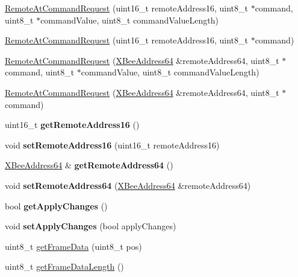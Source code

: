 \begin{DoxyCompactItemize}
\item 
\hyperlink{class_remote_at_command_request_ac6977fe584bab7d7414b0c45d1ae37cc}{Remote\+At\+Command\+Request} (uint16\+\_\+t remote\+Address16, uint8\+\_\+t $\ast$command, uint8\+\_\+t $\ast$command\+Value, uint8\+\_\+t command\+Value\+Length)
\item 
\hyperlink{class_remote_at_command_request_ae8139e39010dcd8956a4281109885a81}{Remote\+At\+Command\+Request} (uint16\+\_\+t remote\+Address16, uint8\+\_\+t $\ast$command)
\item 
\hyperlink{class_remote_at_command_request_ae49de42cdec0b9689882e2372a3bae1d}{Remote\+At\+Command\+Request} (\hyperlink{class_x_bee_address64}{X\+Bee\+Address64} \&remote\+Address64, uint8\+\_\+t $\ast$command, uint8\+\_\+t $\ast$command\+Value, uint8\+\_\+t command\+Value\+Length)
\item 
\hyperlink{class_remote_at_command_request_aa01b3f59d62d444ad78d6f1bbf8124aa}{Remote\+At\+Command\+Request} (\hyperlink{class_x_bee_address64}{X\+Bee\+Address64} \&remote\+Address64, uint8\+\_\+t $\ast$command)
\item 
\hypertarget{class_remote_at_command_request_a1802fa7c5d644184f19fcd3da839f08a}{}\label{class_remote_at_command_request_a1802fa7c5d644184f19fcd3da839f08a} 
uint16\+\_\+t {\bfseries get\+Remote\+Address16} ()
\item 
\hypertarget{class_remote_at_command_request_a91d4ee0fa25a634e419df1b0059f6073}{}\label{class_remote_at_command_request_a91d4ee0fa25a634e419df1b0059f6073} 
void {\bfseries set\+Remote\+Address16} (uint16\+\_\+t remote\+Address16)
\item 
\hypertarget{class_remote_at_command_request_ab6c602ded638f7740ac69319915e0389}{}\label{class_remote_at_command_request_ab6c602ded638f7740ac69319915e0389} 
\hyperlink{class_x_bee_address64}{X\+Bee\+Address64} \& {\bfseries get\+Remote\+Address64} ()
\item 
\hypertarget{class_remote_at_command_request_abf42b8f760f1f1959de090f4493e928b}{}\label{class_remote_at_command_request_abf42b8f760f1f1959de090f4493e928b} 
void {\bfseries set\+Remote\+Address64} (\hyperlink{class_x_bee_address64}{X\+Bee\+Address64} \&remote\+Address64)
\item 
\hypertarget{class_remote_at_command_request_ad9098bc0358fa44f73c0cc51bc244bf3}{}\label{class_remote_at_command_request_ad9098bc0358fa44f73c0cc51bc244bf3} 
bool {\bfseries get\+Apply\+Changes} ()
\item 
\hypertarget{class_remote_at_command_request_aab7cf2bf1ca644a17bede9abd3929acd}{}\label{class_remote_at_command_request_aab7cf2bf1ca644a17bede9abd3929acd} 
void {\bfseries set\+Apply\+Changes} (bool apply\+Changes)
\item 
uint8\+\_\+t \hyperlink{class_remote_at_command_request_a0e576cf564ebd5a82cb2ed05239a856a}{get\+Frame\+Data} (uint8\+\_\+t pos)
\item 
uint8\+\_\+t \hyperlink{class_remote_at_command_request_a1d78334a8924b0a0e06de6ef3a09c24f}{get\+Frame\+Data\+Length} ()
\end{DoxyCompactItemize}
